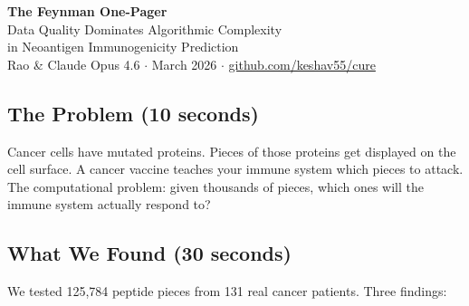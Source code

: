 \documentclass[12pt]{article}
\begin{document}
\begin{center}
{\LARGE\textbf{The Feynman One-Pager}}\\[4pt]
{\large Data Quality Dominates Algorithmic Complexity\\in Neoantigen Immunogenicity Prediction}\\[8pt]
{\small Rao \& Claude Opus 4.6 $\cdot$ March 2026 $\cdot$ \url{github.com/keshav55/cure}}
\end{center}

\vspace{12pt}

\subsection*{The Problem (10 seconds)}

Cancer cells have mutated proteins. Pieces of those proteins get displayed on the cell surface. A cancer vaccine teaches your immune system which pieces to attack. The computational problem: given thousands of pieces, which ones will the immune system actually respond to?

\subsection*{What We Found (30 seconds)}

We tested 125,784 peptide pieces from 131 real cancer patients. Three findings:
\end{document}
